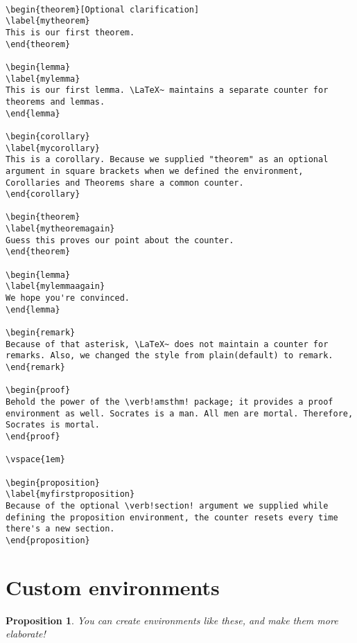 \documentclass[12pt, letterpaper]{article}
\newtheorem{theorem}{Theorem}
\newtheorem{lemma}{Lemma}
\newtheorem{corollary}[theorem]{Corollary}
\newtheorem{proposition}{Proposition}[section]
\theoremstyle{remark}
\newtheorem*{remark}{Remark}
\begin{document}
\begin{lstlisting}

\begin{theorem}[Optional clarification]
\label{mytheorem}
This is our first theorem.
\end{theorem}

\begin{lemma}
\label{mylemma}
This is our first lemma. \LaTeX~ maintains a separate counter for theorems and lemmas.
\end{lemma}

\begin{corollary}
\label{mycorollary}
This is a corollary. Because we supplied "theorem" as an optional argument in square brackets when we defined the environment, Corollaries and Theorems share a common counter.
\end{corollary}

\begin{theorem}
\label{mytheoremagain}
Guess this proves our point about the counter.
\end{theorem}

\begin{lemma}
\label{mylemmaagain}
We hope you're convinced.
\end{lemma}

\begin{remark}
Because of that asterisk, \LaTeX~ does not maintain a counter for remarks. Also, we changed the style from plain(default) to remark. 
\end{remark}

\begin{proof}
Behold the power of the \verb!amsthm! package; it provides a proof environment as well. Socrates is a man. All men are mortal. Therefore, Socrates is mortal.
\end{proof}

\vspace{1em}

\begin{proposition}
\label{myfirstproposition}
Because of the optional \verb!section! argument we supplied while defining the proposition environment, the counter resets every time there's a new section.
\end{proposition}
\end{lstlisting}

\section{Custom environments}
\begin{proposition}
You can create environments like these, and make them more elaborate!
\end{proposition}
\end{document}
